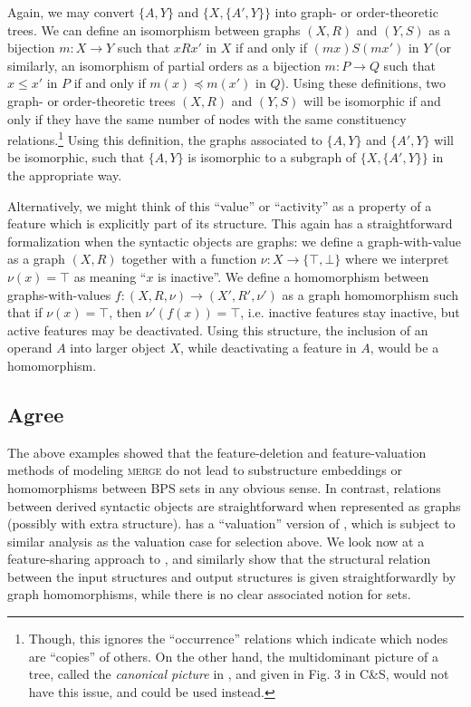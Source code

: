 \documentclass[output=paper]{langsci/langscibook}
\begin{document}
Again, we may convert $\{A,Y\}$ and $\{X,\{A',Y\}\}$ into graph- or
order-theoretic trees. We can define an isomorphism between graphs $(X,R)$ and
$(Y,S)$ as a bijection $m:X\rightarrow Y$ such that $xRx'$ in $X$ if and only
if $(mx) S (mx')$ in $Y$ (or similarly, an isomorphism of partial orders as a
bijection $m:P\rightarrow Q$ such that $x\leq x'$ in $P$ if and only if
$m(x)\preceq m(x')$ in $Q$). Using these definitions, two graph- or
order-theoretic trees $(X,R)$ and $(Y,S)$ will be isomorphic if and only if
they have the same number of nodes with the same constituency
relations.\footnote{Though, this ignores the \enquote{occurrence} relations which
    indicate which nodes are \enquote{copies} of others. On the other hand, the
multidominant picture of a tree, called the \emph{canonical picture} in
\citet{aczel}, and given in Fig. 3 in C\&S, would not have
this issue, and could be used instead.} Using this definition, the graphs
associated to $\{A,Y\}$ and $\{A',Y\}$ will be isomorphic, such that $\{A,Y\}$
is isomorphic to a subgraph of $\{X,\{A',Y\}\}$ in the appropriate way.

Alternatively, we might think of this \enquote{value} or \enquote{activity} as a property of a
feature which is explicitly part of its structure. This again has a
straightforward formalization when the syntactic objects are graphs: we define
a graph-with-value as a graph $(X,R)$ together with a function
$\nu:X\rightarrow\{\top,\bot\}$ where we interpret $\nu (x)=\top$ as meaning
``$x$ is inactive''. We define a homomorphism between graphs-with-values
$f:(X,R,\nu)\rightarrow (X',R',\nu')$ as a graph homomorphism such that if
$\nu(x)=\top$, then $\nu'(f(x))=\top$, i.e. inactive features stay inactive,
but active features may be deactivated. Using this structure, the inclusion of
an operand $A$ into larger object $X$, while deactivating a feature in $A$,
would be a homomorphism.

\subsection{Agree}

The above examples showed that the feature-deletion and feature-valuation\linebreak
methods of modeling \textsc{merge} do not lead to substructure embeddings or
homomorphisms between \gls{BPS} sets in any obvious sense.  In contrast,
relations between derived syntactic objects are straightforward when
represented as graphs (possibly with extra structure).
\citet{chomsky1999derivation} has a \enquote{valuation} version of , which is
subject to similar analysis as the valuation case for selection above. We look
now at a feature-sharing approach to , and similarly show that the
structural relation between the input structures and output structures is given
straightforwardly by graph homomorphisms, while there is no clear associated
notion for sets.
\end{document}

